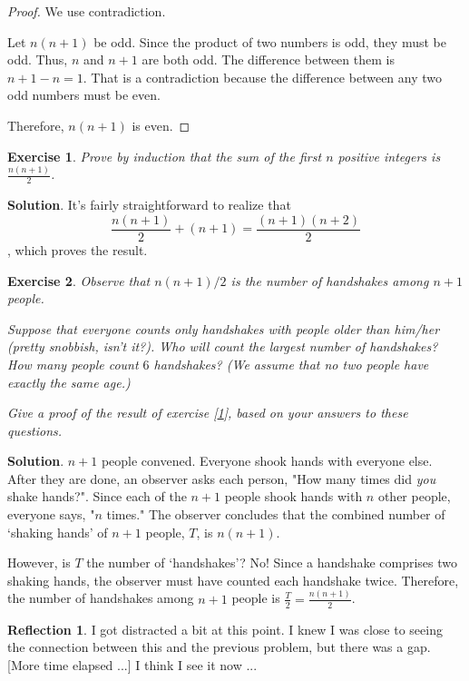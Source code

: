 \documentclass[11pt]{book}
\theoremstyle{definition}
\theoremstyle{plain}
\newtheorem{exercise}{Exercise}
\theoremstyle{definition}
\theoremstyle{problemstyle}
\theoremstyle{remark}
\theoremstyle{definition}
\newtheorem{reflection}{Reflection}
\begin{document}
\begin{proof}
    We use contradiction.

    Let $n(n+1)$ be odd. Since the product of two numbers is odd, they must be odd. Thus, $n$ and $n+1$ are both odd. The difference between them is $n+1-n=1$. That is a contradiction because the difference between any two odd numbers must be even.

    Therefore, $n(n+1)$ is even.
\end{proof}
\begin{exercise}
    \label{ex:2.1.2}
    Prove by induction that the sum of the first $n$ positive integers is $\frac{n(n+1)}{2}$.
\end{exercise}
\textbf{Solution}.
It's fairly straightforward to realize that 
\[
    \frac{n(n+1)}{2}+(n+1)=\frac{(n+1)(n+2)}{2}
\]
, which proves the result.
\begin{exercise}
    \label{ex:2.1.3}
    Observe that $n(n+1)/2$ is the number of handshakes among $n+1$ people. 

    Suppose that everyone counts only handshakes with people older than him/her (pretty snobbish, isn't it?). Who will count the largest number of handshakes? How many people count $6$ handshakes? (We assume that no two people have exactly the same age.)

    Give a proof of the result of exercise [\ref{ex:2.1.2}], based on your answers to these questions.
\end{exercise}
\textbf{Solution}.
$n+1$ people convened. Everyone shook hands with everyone else. After they are done, an observer asks each person, "How many times did \emph{you} shake hands?". Since each of the $n+1$ people shook hands with $n$ other people, everyone says, "$n$ times." The observer concludes that the combined number of `shaking hands' of $n+1$ people, $T$, is $n(n+1)$.

However, is $T$ the number of `handshakes'? No! Since a handshake comprises two shaking hands, the observer must have counted each handshake twice. Therefore, the number of handshakes among $n+1$ people is $\frac{T}{2}=\frac{n(n+1)}{2}$.

\begin{reflection}
    I got distracted a bit at this point. I knew I was close to seeing the connection between this and the previous problem, but there was a gap. [More time elapsed ...] I think I see it now ...
\end{reflection}
\end{document}
